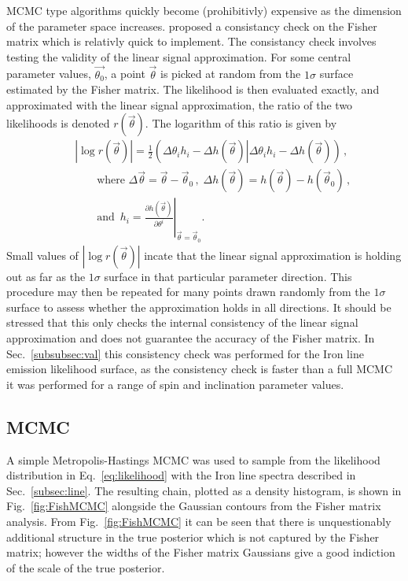 MCMC type algorithms quickly become (prohibitivly) expensive as the dimension of the parameter space increases. \cite{Vallisneri} proposed a consistancy check on the Fisher matrix which is relativly quick to implement. The consistancy check involves testing the validity of the linear signal approximation. For some central parameter values, $\vec{\theta_{0}}$, a point $\vec{\theta}$ is picked at random from the $1\sigma$ surface estimated by the Fisher matrix. The likelihood is then evaluated exactly, and approximated with the linear signal approximation, the ratio of the two likelihoods is denoted $r(\vec{\theta})$. The logarithm of this ratio is given by
\begin{eqnarray}\label{eq:val} 
&&\left| \log   r(\vec{\theta}) \right| =\frac{1}{2}\left.\left(\Delta\theta_{i}h_{i}-\Delta h(\vec{\theta})\right\vert\Delta\theta_{i}h_{i}-\Delta h(\vec{\theta})\right) \, ,\nonumber\\
&&\quad\quad\textrm{where }\Delta\vec{\theta}=\vec{\theta}-\vec{\theta}_{0}\,,\; \Delta h (\vec{\theta})=h(\vec{\theta})-h(\vec{\theta}_{0})\,,\nonumber \\
&&\quad\quad\textrm{and }\, h_{i}=\left.\frac{\partial h(\vec{\theta})}{\partial \theta^{i}}\right|_{\vec{\theta}=\vec{\theta}_{0}} .\end{eqnarray}
Small values of $|\log r(\vec{\theta})|$ incate that the linear signal approximation is holding out as far as the $1\sigma$ surface in that particular parameter direction. This procedure may then be repeated for many points drawn randomly from the $1\sigma$ surface to assess whether the approximation holds in all directions. It should be stressed that this only checks the internal consistency of the linear signal approximation and does not guarantee the accuracy of the Fisher matrix. In Sec.\ \ref{subsubsec:val} this consistency check was performed for the Iron line emission likelihood surface, as the consistency check is faster than a full MCMC it was performed for a range of spin and inclination parameter values.

\subsection{MCMC}\label{subsubsec:MCMC}
A simple Metropolis-Hastings MCMC was used to sample from the likelihood distribution in Eq.\ \ref{eq:likelihood} with the Iron line spectra described in Sec.\ \ref{subsec:line}. The resulting chain, plotted as a density histogram, is shown in Fig.\ \ref{fig:FishMCMC} alongside the Gaussian contours from the Fisher matrix analysis. From Fig.\ \ref{fig:FishMCMC} it can be seen that there is unquestionably additional structure in the true posterior which is not captured by the Fisher matrix; however the widths of the Fisher matrix Gaussians give a good indiction of the scale of the true posterior.

